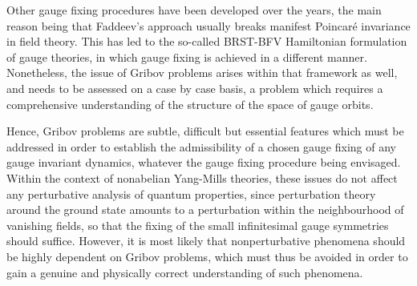 \documentclass[a4paper,11pt]{article}
\begin{document}
Other gauge fixing procedures have been developed over the years, the
main reason being that Faddeev's approach usually breaks manifest Poincar\'e
invariance in field theory. This has led to the so-called BRST-BFV
Hamiltonian formulation of gauge theories,\cite{JG1,BFV1} in which gauge 
fixing is achieved in a different manner. Nonetheless, the issue of Gribov 
problems arises within that framework as well,\cite{JG1,JG4,JG5} and needs to 
be assessed on a case by case basis, a problem which requires a comprehensive 
understanding of the structure of the space of gauge orbits.

Hence, Gribov problems are subtle, difficult but essential features which
must be addressed in order to establish the admissibility of a chosen gauge
fixing of any gauge invariant dynamics, whatever the gauge fixing procedure
being envisaged. Within the context of nonabelian Yang-Mills theories,
these issues do not affect any perturbative analysis of quantum properties,
since perturbation theory around the ground state amounts to a perturbation
within the neighbourhood of vanishing fields, so that the fixing of
the small in\-fi\-ni\-te\-si\-mal gauge symmetries should suffice. However, 
it is most likely that nonperturbative phenomena should be highly dependent
on Gribov problems, which must thus be avoided in order to gain a genuine
and physically correct understanding of such phenomena.
\end{document}
